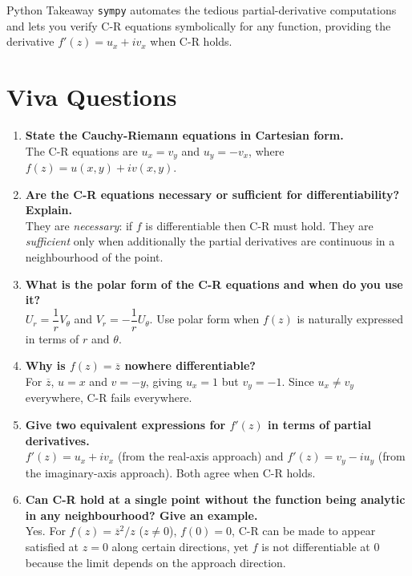 \documentclass[12pt,a4paper]{article}
\begin{document}
\begin{learnbox}{Python Takeaway}
\texttt{sympy} automates the tedious partial-derivative computations and lets you verify C-R equations symbolically for any function, providing the derivative $f'(z) = u_x + iv_x$ when C-R holds.
\end{learnbox}

\section{Viva Questions}

\begin{enumerate}
  \item \textbf{State the Cauchy-Riemann equations in Cartesian form.}\\
  The C-R equations are $u_x = v_y$ and $u_y = -v_x$, where $f(z) = u(x,y)+iv(x,y)$.

  \item \textbf{Are the C-R equations necessary or sufficient for differentiability? Explain.}\\
  They are \emph{necessary}: if $f$ is differentiable then C-R must hold. They are \emph{sufficient} only when additionally the partial derivatives are continuous in a neighbourhood of the point.

  \item \textbf{What is the polar form of the C-R equations and when do you use it?}\\
  $U_r = \dfrac{1}{r}V_\theta$ and $V_r = -\dfrac{1}{r}U_\theta$. Use polar form when $f(z)$ is naturally expressed in terms of $r$ and $\theta$.

  \item \textbf{Why is $f(z) = \overline{z}$ nowhere differentiable?}\\
  For $\overline{z}$, $u = x$ and $v = -y$, giving $u_x = 1$ but $v_y = -1$. Since $u_x \neq v_y$ everywhere, C-R fails everywhere.

  \item \textbf{Give two equivalent expressions for $f'(z)$ in terms of partial derivatives.}\\
  $f'(z) = u_x + iv_x$ (from the real-axis approach) and $f'(z) = v_y - iu_y$ (from the imaginary-axis approach). Both agree when C-R holds.

  \item \textbf{Can C-R hold at a single point without the function being analytic in any neighbourhood? Give an example.}\\
  Yes. For $f(z) = \overline{z}^2/z$ ($z\neq 0$), $f(0)=0$, C-R can be made to appear satisfied at $z=0$ along certain directions, yet $f$ is not differentiable at 0 because the limit depends on the approach direction.


\end{enumerate}
\end{document}
